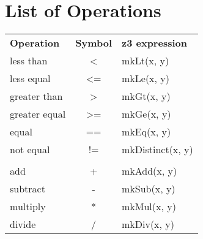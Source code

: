 \chapter{List of Operations}

\begin{tabular}{lcl}
 
\textbf{Operation} & \textbf{Symbol} & \textbf{z3 expression} \\
 
less than & < & mkLt(x, y) \\
less equal & <= & mkLe(x, y) \\
greater than & > & mkGt(x, y) \\
greater equal & >= & mkGe(x, y) \\
equal & == & mkEq(x, y) \\
not equal & != & mkDistinct(x, y) \\\\

add & + & mkAdd(x, y) \\
subtract & - & mkSub(x, y) \\
multiply & * & mkMul(x, y) \\
divide & / & mkDiv(x, y) \\
 

 
\end{tabular}